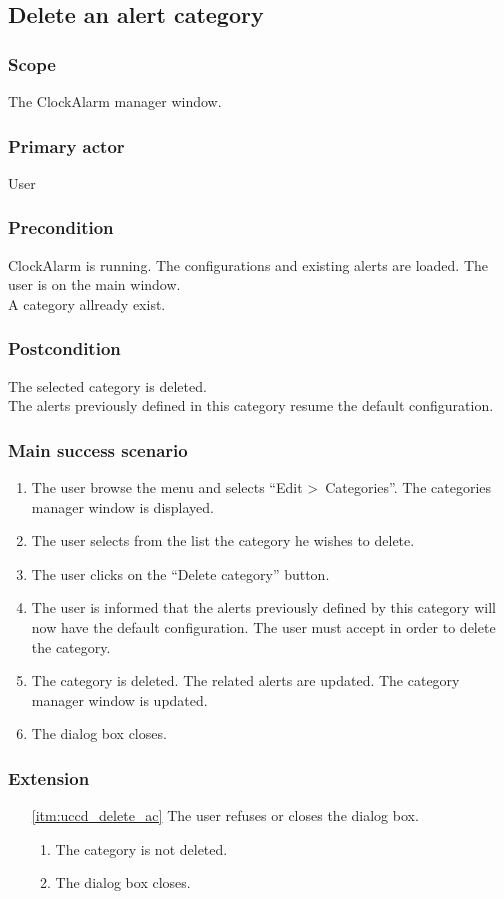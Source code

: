 \subsection{Delete an alert category}

\subsubsection{Scope}
The ClockAlarm manager window.
\subsubsection{Primary actor}
User
\subsubsection{Precondition}
ClockAlarm is running. The configurations and existing alerts are loaded. The user is on the main window.
\\A category allready exist.
\subsubsection{Postcondition}
The selected category is deleted.\\The alerts previously defined in this category resume the default configuration.
\subsubsection{Main success scenario}
\begin{enumerate}
	\item The user browse the menu and selects ``Edit \textgreater~Categories''. The categories manager window is displayed. 
	\item The user selects from the list the category he wishes to delete.
	\item The user clicks on the ``Delete category'' button.
	\item\label{itm:uccd_delete_ac} The user is informed that the alerts previously defined by this category will now have the default configuration. The user must accept in order to delete the category.
	\item The category is deleted. The related alerts are updated. The category manager window is updated. 
	\item The dialog box closes.
\end{enumerate}
\subsubsection{Extension}
\begin{enumerate}
	\item[\ref{itm:uccd_delete_ac}] The user refuses or closes the dialog box.
	\begin{enumerate}[i]
		\item The category is not deleted.
		\item The dialog box closes.
	\end{enumerate}
\end{enumerate}